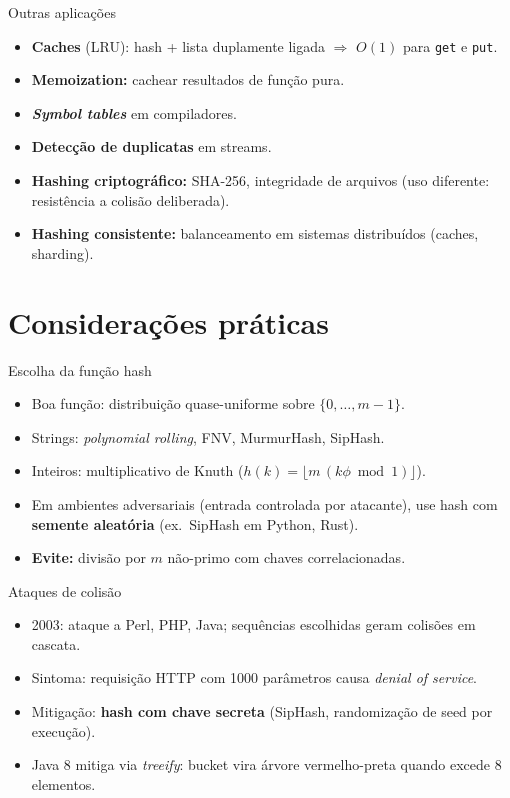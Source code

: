\documentclass[aspectratio=169]{beamer}
\begin{document}
\begin{frame}{Outras aplicações}
\begin{itemize}
    \item \textbf{Caches} (LRU): hash + lista duplamente ligada $\Rightarrow$ $O(1)$
    para \texttt{get} e \texttt{put}.
    \item \textbf{Memoization:} cachear resultados de função pura.
    \item \textbf{\emph{Symbol tables}} em compiladores.
    \item \textbf{Detecção de duplicatas} em streams.
    \item \textbf{Hashing criptográfico:} SHA-256, integridade de arquivos
    (uso diferente: resistência a colisão deliberada).
    \item \textbf{Hashing consistente:} balanceamento em sistemas distribuídos
    (caches, sharding).
\end{itemize}
\end{frame}

\section{Considerações práticas}

\begin{frame}{Escolha da função hash}
\begin{itemize}
    \item Boa função: distribuição quase-uniforme sobre $\{0,\dots,m-1\}$.
    \item Strings: \emph{polynomial rolling}, FNV, MurmurHash, SipHash.
    \item Inteiros: multiplicativo de Knuth ($h(k) = \lfloor m\,(k\phi \bmod 1) \rfloor$).
    \item Em ambientes adversariais (entrada controlada por atacante), use hash
    com \textbf{semente aleatória} (ex.\ SipHash em Python, Rust).
    \item \textbf{Evite:} divisão por $m$ não-primo com chaves correlacionadas.
\end{itemize}
\end{frame}

\begin{frame}{Ataques de colisão}
\begin{itemize}
    \item 2003: ataque a Perl, PHP, Java; sequências escolhidas geram colisões em
    cascata.
    \item Sintoma: requisição HTTP com 1000 parâmetros causa \emph{denial of service}.
    \item Mitigação: \textbf{hash com chave secreta} (SipHash, randomização de seed
    por execução).
    \item Java 8 mitiga via \emph{treeify}: bucket vira árvore vermelho-preta quando
    excede 8 elementos.
\end{itemize}
\end{frame}
\end{document}
